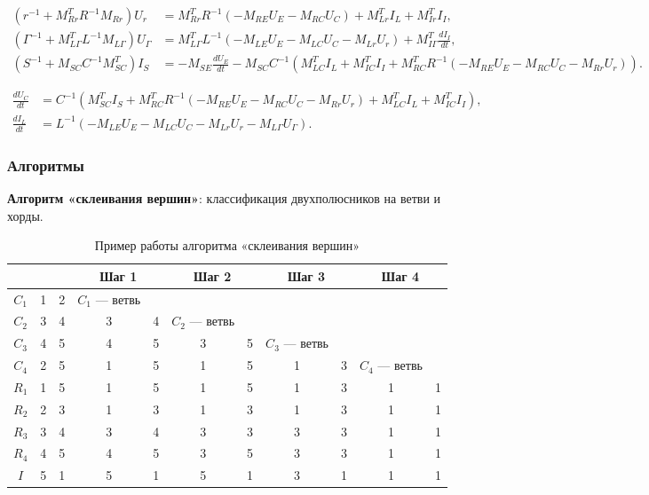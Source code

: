 	\begin{align}
		(r^{-1} + M_{Rr}^T R^{-1} M_{Rr}) U_r &= M_{Rr}^T R^{-1} (-M_{RE} U_E - M_{RC} U_C) + M_{Lr}^T I_L + M_{Ir}^T I_I, \\
		(\Gamma^{-1} + M_{L\Gamma}^T L^{-1} M_{L\Gamma}) U_\Gamma &= M_{L\Gamma}^T L^{-1} (-M_{LE} U_E - M_{LC} U_C - M_{Lr} U_r) + M_{I\Gamma}^T \frac{d I_I}{dt}, \\
		(S^{-1} + M_{SC} C^{-1} M_{SC}^T) I_S &= -M_{SE} \frac{d U_E}{dt} - M_{SC} C^{-1} (M_{LC}^T I_L + M_{IC}^T I_I + M_{RC}^T R^{-1} (-M_{RE} U_E - M_{RC} U_C - M_{Rr} U_r)).
	\end{align}
	
	\begin{align}
		\frac{d U_C}{dt} &= C^{-1} (M_{SC}^T I_S + M_{RC}^T R^{-1} (-M_{RE} U_E - M_{RC} U_C - M_{Rr} U_r) + M_{LC}^T I_L + M_{IC}^T I_I), \\
		\frac{d I_L}{dt} &= L^{-1} (-M_{LE} U_E - M_{LC} U_C - M_{Lr} U_r - M_{L\Gamma} U_\Gamma).
	\end{align}
	
	\subsubsection{Алгоритмы}
	
	\textbf{Алгоритм «склеивания вершин»}: классификация двухполюсников на ветви и хорды.
	
	\begin{table}[H]
		\centering
		\caption{Пример работы алгоритма «склеивания вершин»}
		\begin{tabular}{|c|cc|cc|cc|cc|cc|}
			\hline
			& \multicolumn{2}{c|}{} & \multicolumn{2}{c|}{Шаг 1} & \multicolumn{2}{c|}{Шаг 2} & \multicolumn{2}{c|}{Шаг 3} & \multicolumn{2}{c|}{Шаг 4} \\
			\hline
			$C_1$ & 1 & 2 & $C_1$ — ветвь & & & & & & & \\
			$C_2$ & 3 & 4 & 3 & 4 & $C_2$ — ветвь & & & & & \\
			$C_3$ & 4 & 5 & 4 & 5 & 3 & 5 & $C_3$ — ветвь & & & \\
			$C_4$ & 2 & 5 & 1 & 5 & 1 & 5 & 1 & 3 & $C_4$ — ветвь & \\
			$R_1$ & 1 & 5 & 1 & 5 & 1 & 5 & 1 & 3 & 1 & 1 \\
			$R_2$ & 2 & 3 & 1 & 3 & 1 & 3 & 1 & 3 & 1 & 1 \\
			$R_3$ & 3 & 4 & 3 & 4 & 3 & 3 & 3 & 3 & 1 & 1 \\
			$R_4$ & 4 & 5 & 4 & 5 & 3 & 5 & 3 & 3 & 1 & 1 \\
			$I$ & 5 & 1 & 5 & 1 & 5 & 1 & 3 & 1 & 1 & 1 \\
			\hline
		\end{tabular}
	\end{table}
	
